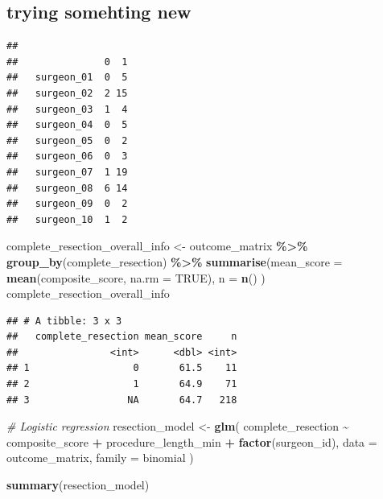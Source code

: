 \documentclass[
]{article}
\newenvironment{Shaded}{\begin{snugshade}}{\end{snugshade}}
\newcommand{\AttributeTok}[1]{\textcolor[rgb]{0.13,0.29,0.53}{#1}}
\newcommand{\CommentTok}[1]{\textcolor[rgb]{0.56,0.35,0.01}{\textit{#1}}}
\newcommand{\ConstantTok}[1]{\textcolor[rgb]{0.56,0.35,0.01}{#1}}
\newcommand{\FunctionTok}[1]{\textcolor[rgb]{0.13,0.29,0.53}{\textbf{#1}}}
\newcommand{\NormalTok}[1]{#1}
\newcommand{\OtherTok}[1]{\textcolor[rgb]{0.56,0.35,0.01}{#1}}
\newcommand{\SpecialCharTok}[1]{\textcolor[rgb]{0.81,0.36,0.00}{\textbf{#1}}}
\begin{document}
\subsection{trying somehting new}\label{trying-somehting-new}

\begin{Shaded}
\end{Shaded}

\begin{verbatim}
##             
##               0  1
##   surgeon_01  0  5
##   surgeon_02  2 15
##   surgeon_03  1  4
##   surgeon_04  0  5
##   surgeon_05  0  2
##   surgeon_06  0  3
##   surgeon_07  1 19
##   surgeon_08  6 14
##   surgeon_09  0  2
##   surgeon_10  1  2
\end{verbatim}

\begin{Shaded}
\begin{Highlighting}[]
\NormalTok{complete\_resection\_overall\_info }\OtherTok{\textless{}{-}}\NormalTok{ outcome\_matrix }\SpecialCharTok{\%\textgreater{}\%}
  \FunctionTok{group\_by}\NormalTok{(complete\_resection) }\SpecialCharTok{\%\textgreater{}\%}
  \FunctionTok{summarise}\NormalTok{(}\AttributeTok{mean\_score =} \FunctionTok{mean}\NormalTok{(composite\_score, }\AttributeTok{na.rm =} \ConstantTok{TRUE}\NormalTok{),}
    \AttributeTok{n =} \FunctionTok{n}\NormalTok{()}
\NormalTok{  )}
\NormalTok{complete\_resection\_overall\_info}
\end{Highlighting}
\end{Shaded}

\begin{verbatim}
## # A tibble: 3 x 3
##   complete_resection mean_score     n
##                <int>      <dbl> <int>
## 1                  0       61.5    11
## 2                  1       64.9    71
## 3                 NA       64.7   218
\end{verbatim}

\begin{Shaded}
\begin{Highlighting}[]
\CommentTok{\# Logistic regression}
\NormalTok{resection\_model }\OtherTok{\textless{}{-}} \FunctionTok{glm}\NormalTok{( complete\_resection }\SpecialCharTok{\textasciitilde{}}\NormalTok{ composite\_score }\SpecialCharTok{+}
\NormalTok{                          procedure\_length\_min }\SpecialCharTok{+}
                          \FunctionTok{factor}\NormalTok{(surgeon\_id),}
                        \AttributeTok{data =}\NormalTok{ outcome\_matrix,}
                        \AttributeTok{family =}\NormalTok{ binomial )}

\FunctionTok{summary}\NormalTok{(resection\_model)}
\end{Highlighting}
\end{Shaded}
\end{document}

